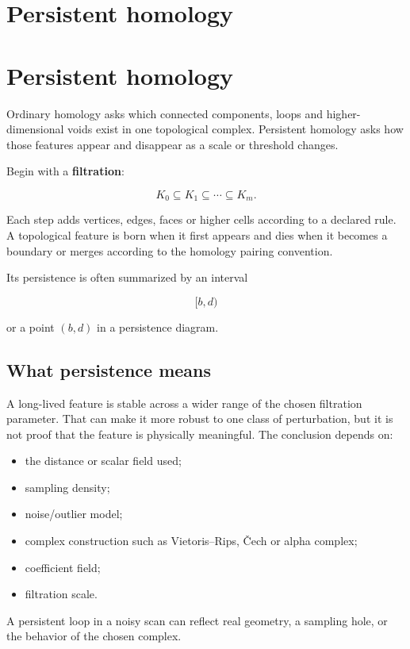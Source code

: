 \hypertarget{appendix-e4d8ed8d6787}{}
\section*{Persistent homology}
\section{Persistent homology}\label{persistent-homology}

Ordinary homology asks which connected components, loops and higher-dimensional voids exist in one topological complex. Persistent homology asks how those features appear and disappear as a scale or threshold changes.

Begin with a \textbf{filtration}:

\[
K_0\subseteq K_1\subseteq\cdots\subseteq K_m.
\]

Each step adds vertices, edges, faces or higher cells according to a declared rule. A topological feature is born when it first appears and dies when it becomes a boundary or merges according to the homology pairing convention.

Its persistence is often summarized by an interval

\[
[b,d)
\]

or a point \((b,d)\) in a persistence diagram.

\subsection{What persistence means}\label{what-persistence-means}

A long-lived feature is stable across a wider range of the chosen filtration parameter. That can make it more robust to one class of perturbation, but it is not proof that the feature is physically meaningful. The conclusion depends on:

\begin{itemize}
\tightlist
\item
  the distance or scalar field used;
\item
  sampling density;
\item
  noise/outlier model;
\item
  complex construction such as Vietoris--Rips, Čech or alpha complex;
\item
  coefficient field;
\item
  filtration scale.
\end{itemize}

A persistent loop in a noisy scan can reflect real geometry, a sampling hole, or the behavior of the chosen complex.


